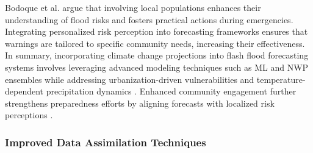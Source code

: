 Bodoque et al. \citep{Bodoque2019} argue that involving local populations enhances their understanding of flood risks and fosters practical actions during emergencies. Integrating personalized risk perception into forecasting frameworks ensures that warnings are tailored to specific community needs, increasing their effectiveness. In summary, incorporating climate change projections into flash flood forecasting systems involves leveraging advanced modeling techniques such as ML and NWP ensembles while addressing urbanization-driven vulnerabilities and temperature-dependent precipitation dynamics \citep{Msigwa2024}\citep{Abegaz2024}\citep{Georgakakos2022}. Enhanced community engagement further strengthens preparedness efforts by aligning forecasts with localized risk perceptions \citep{Bodoque2019}.

\subsubsection{Improved Data Assimilation Techniques}
